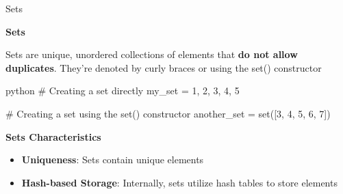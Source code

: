 \documentclass[
	11pt, 
]{beamer}
\begin{document}
\begin{frame}[fragile]{Sets}
\scriptsize
    
\begin{block}{\textbf{Sets}}
    
Sets are unique, unordered collections of elements that \textbf{do not allow duplicates}. They're denoted by curly braces {} or using the set() constructor
\end{block}

\bigskip

\begin{mintedbox}{python}
# Creating a set directly
my_set = {1, 2, 3, 4, 5}

# Creating a set using the set() constructor
another_set = set([3, 4, 5, 6, 7]) 
\end{mintedbox}

\begin{exampleblock}{\textbf{Sets Characteristics}}
    \begin{itemize}
        \item \textbf{Uniqueness}: Sets contain unique elements
        \item \textbf{Hash-based Storage}: Internally, sets utilize hash tables to store elements
    \end{itemize}    
\end{exampleblock}


\end{frame}



\end{document}
